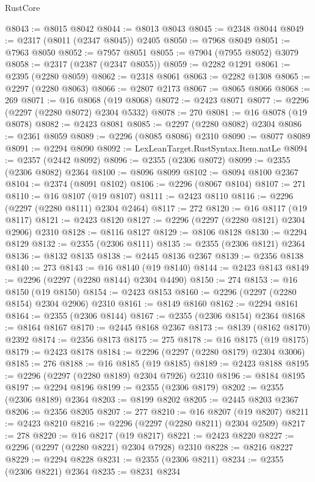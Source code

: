 \begin{lexlean}{RustCore}
\begin{coremodule}
@8043 := @8015 @8042
@8044 := @8013 @8043
@8045 := @2348 @8044
@8049 := @2317 (@8011 (@2347 @8045)) @2405
@8050 := @7968 @8049
@8051 := @7963 @8050
@8052 := @7957 @8051
@8055 := @7904 (@7955 @8052) @3079
@8058 := @2317 (@2387 (@2347 @8055))
@8059 := @2282 @1291
@8061 := @2395 (@2280 @8059)
@8062 := @2318 @8061
@8063 := @2282 @1308
@8065 := @2297 (@2280 @8063)
@8066 := @2807 @2173
@8067 := @8065 @8066
@8068 := 269
@8071 := @16 @8068 (@19 @8068)
@8072 := @2423 @8071
@8077 := @2296 (@2297 (@2280 @8072) @2304 @5332)
@8078 := 270
@8081 := @16 @8078 (@19 @8078)
@8082 := @2423 @8081
@8085 := @2297 (@2280 @8082) @2304
@8086 := @2361 @8059
@8089 := @2296 (@8085 @8086) @2310
@8090 := @8077 @8089
@8091 := @2294 @8090
@8092 := LexLeanTarget.RustSyntax.Item.natLe
@8094 := @2357 (@2442 @8092)
@8096 := @2355 (@2306 @8072)
@8099 := @2355 (@2306 @8082) @2364
@8100 := @8096 @8099
@8102 := @8094 @8100 @2367
@8104 := @2374 (@8091 @8102)
@8106 := @2296 (@8067 @8104)
@8107 := 271
@8110 := @16 @8107 (@19 @8107)
@8111 := @2423 @8110
@8116 := @2296 (@2297 (@2280 @8111) @2304 @2464)
@8117 := 272
@8120 := @16 @8117 (@19 @8117)
@8121 := @2423 @8120
@8127 := @2296 (@2297 (@2280 @8121) @2304 @2906) @2310
@8128 := @8116 @8127
@8129 := @8106 @8128
@8130 := @2294 @8129
@8132 := @2355 (@2306 @8111)
@8135 := @2355 (@2306 @8121) @2364
@8136 := @8132 @8135
@8138 := @2445 @8136 @2367
@8139 := @2356 @8138
@8140 := 273
@8143 := @16 @8140 (@19 @8140)
@8144 := @2423 @8143
@8149 := @2296 (@2297 (@2280 @8144) @2304 @4490)
@8150 := 274
@8153 := @16 @8150 (@19 @8150)
@8154 := @2423 @8153
@8160 := @2296 (@2297 (@2280 @8154) @2304 @2906) @2310
@8161 := @8149 @8160
@8162 := @2294 @8161
@8164 := @2355 (@2306 @8144)
@8167 := @2355 (@2306 @8154) @2364
@8168 := @8164 @8167
@8170 := @2445 @8168 @2367
@8173 := @8139 (@8162 @8170) @2392
@8174 := @2356 @8173
@8175 := 275
@8178 := @16 @8175 (@19 @8175)
@8179 := @2423 @8178
@8184 := @2296 (@2297 (@2280 @8179) @2304 @3006)
@8185 := 276
@8188 := @16 @8185 (@19 @8185)
@8189 := @2423 @8188
@8195 := @2296 (@2297 (@2280 @8189) @2304 @7926) @2310
@8196 := @8184 @8195
@8197 := @2294 @8196
@8199 := @2355 (@2306 @8179)
@8202 := @2355 (@2306 @8189) @2364
@8203 := @8199 @8202
@8205 := @2445 @8203 @2367
@8206 := @2356 @8205
@8207 := 277
@8210 := @16 @8207 (@19 @8207)
@8211 := @2423 @8210
@8216 := @2296 (@2297 (@2280 @8211) @2304 @2509)
@8217 := 278
@8220 := @16 @8217 (@19 @8217)
@8221 := @2423 @8220
@8227 := @2296 (@2297 (@2280 @8221) @2304 @7928) @2310
@8228 := @8216 @8227
@8229 := @2294 @8228
@8231 := @2355 (@2306 @8211)
@8234 := @2355 (@2306 @8221) @2364
@8235 := @8231 @8234

\end{coremodule}
\end{lexlean}
